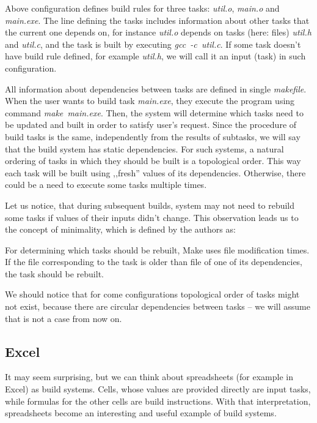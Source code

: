 Above configuration defines build rules for three tasks: \textit{util.o}, \textit{main.o} and \textit{main.exe}. The line defining the tasks includes information about other tasks that the current one depends on, for instance \textit{util.o} depends on tasks (here: files) \textit{util.h} and \textit{util.c}, and the task is built by executing \textit{gcc~\nobreakdash-c~util.c}. If some task doesn't have build rule defined, for example \textit{util.h}, we will call it an input (task) in such configuration.

All information about dependencies between tasks are defined in single \textit{makefile}. When the user wants to build task \textit{main.exe}, they execute the program using command \textit{make~main.exe}. Then, the system will determine which tasks need to be updated and built in order to satisfy user's request. Since the procedure of build tasks is the same, independently from the results of subtasks, we will say that the build system has static dependencies. For such systems, a natural ordering of tasks in which they should be built is a topological order. This way each task will be built using ,,fresh'' values of its dependencies. Otherwise, there could be a need to execute some tasks multiple times.

Let us notice, that during subsequent builds, system may not need to rebuild some tasks if values of their inputs didn't change. This observation leads us to the concept of minimality, which is defined by the authors as:


For determining which tasks should be rebuilt, Make uses file modification times. If the file corresponding to the task is older than file of one of its dependencies, the task should be rebuilt.

We should notice that for come configurations topological order of tasks might not exist, because there are circular dependencies between tasks -- we will assume that is not a case from now on.

\subsection{Excel}

It may seem surprising, but we can think about spreadsheets (for example in Excel) as build systems. Cells, whose values are provided directly are input tasks, while formulas for the other cells are build instructions. With that interpretation, spreadsheets become an interesting and useful example of build systems.


